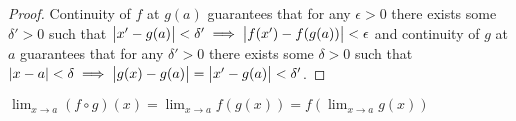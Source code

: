 \documentclass[../MathsNotesBase.tex]{subfiles}
\begin{document}
{		
		\begin{proof}
			Continuity of $f$ at $g(a)$ guarantees that for any ${ \epsilon > 0 }$ there exists some ${ \delta' > 0 }$ such that ${ \left\lvert x' - g(a)\right\rvert < \delta' \implies \left\lvert f(x') - f(g(a))\right\rvert < \epsilon }$ and continuity of $g$ at $a$ guarantees that for any ${ \delta' > 0 }$ there exists some ${ \delta > 0 }$ such that ${ \left\lvert x - a\right\rvert < \delta \implies \left\lvert g(x) - g(a)\right\rvert = \left\lvert x' - g(a)\right\rvert < \delta' }$.
		\end{proof}
		\begin{corollary}
			${ \lim_{x \to a} (f \circ g)(x) = \lim_{x \to a} f(g(x)) = f(\lim_{x \to a} g(x)) }$
		\end{corollary}
	
		\bigskip
}
\end{document}

